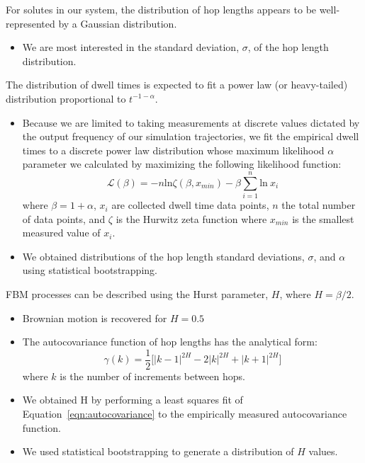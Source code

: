 \documentclass{article}
\begin{document}
  For solutes in our system, the distribution of hop lengths appears to be
  well-represented by a Gaussian distribution.~\cite{metzler_random_2000,
  metzler_anomalous_2014,neusius_subdiffusion_2009}
  \begin{itemize}
	\item We are most interested in the standard deviation, $\sigma$, of the 
	hop length distribution.
  \end{itemize}
  
  The distribution of dwell	times is expected to fit a power law (or heavy-tailed)
  distribution proportional to $t^{-1-\alpha}$.~\cite{meroz_toolbox_2015}
  \begin{itemize}
	\item Because we are limited to taking measurements at discrete values
	dictated by the output frequency of our simulation trajectories, we fit the
	empirical dwell times to a discrete power law distribution whose maximum
	likelihood $\alpha$ parameter we calculated by maximizing the following
	likelihood function: 
        \begin{equation}
	\mathcal{L}(\beta) = -n\text{ln}\zeta(\beta, x_{min}) -
	\beta\sum_{i=1}^{n} \text{ln}~x_i 
	\label{eqn:powerlaw_likelihood}
	\end{equation}
	where $\beta = 1 + \alpha$, $x_i$ are collected dwell time data points,
	$n$ the total number of data points, and $\zeta$ is the Hurwitz zeta function
	where $x_{min}$ is the smallest measured value of
	$x_i$.~\cite{clauset_power-law_2009} 
	\item We obtained distributions of the hop length standard deviations, $\sigma$, and
	$\alpha$ using statistical bootstrapping.\cite{efron_introduction_1994} 
  \end{itemize}
  
  \noindent FBM processes can be described using the Hurst parameter, $H$, where 
  $H = \beta/2$.
  \begin{itemize}
  	\item Brownian motion is recovered for $H = 0.5$
	\item The autocovariance function of hop lengths has the analytical form:~\cite{mandelbrot_fractional_1968}
    \begin{equation}
	\gamma(k) = \dfrac{1}{2}\bigg[|k-1|^{2H} - 2|k|^{2H} + |k+1|^{2H}\bigg]
	\label{eqn:autocovariance}
	\end{equation}
	where $k$ is the number of increments between hops.
	\item We obtained H by performing a least squares fit of Equation~\ref{eqn:autocovariance}
	to the empirically measured autocovariance function.
	\item We used statistical bootstrapping to generate a distribution of $H$ 
	values. %
  \end{itemize}
  
\end{document}

